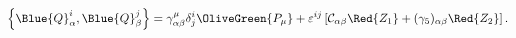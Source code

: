 \begin{equation}
  \left\{ \Blue{Q}^i_\alpha ,\Blue{Q}^j_\beta \right\} =
  \gamma ^\mu
_{\alpha \beta }\delta ^i_j\OliveGreen{P_\mu
  }+\varepsilon ^{ij}\left[ {\cal C}_{\alpha \beta }\Red{Z_1}+
  (\gamma _5)_{\alpha \beta }\Red{Z_2}\right].
 \label{D4N2Z}
\end{equation}

